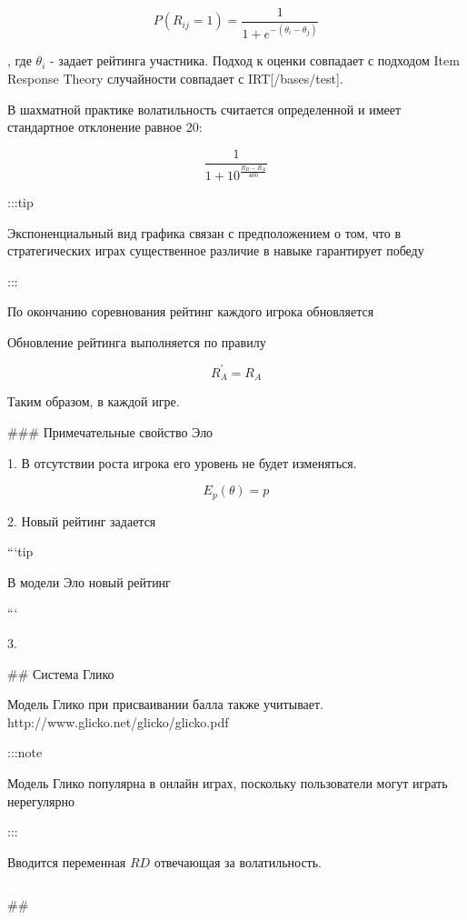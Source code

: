 $$
    P(R_{ij}=1) = \frac{1}{1 + e^{-(\theta_i - \theta_j)}}
$$

, где $\theta_i$ - задает рейтинга участника. Подход к оценки совпадает с подходом Item Response Theory случайности совпадает с IRT[/bases/test]. 





В шахматной практике волатильность считается определенной и имеет стандартное отклонение равное 20:

$$
    \frac{1}{1+10^\frac{R_B-R_A}{400}}
$$

:::tip

    Экспоненциальный вид графика связан с предположением о том, что в стратегических играх существенное различие в навыке гарантирует победу

:::

По окончанию соревнования рейтинг каждого игрока обновляется

Обновление рейтинга выполняется по правилу

$$
    R^'_A = R_A
$$


Таким образом, в каждой игре.

### Примечательные свойство Эло


1. В отсутствии роста игрока его уровень не будет изменяться.

$$
    E_p(\theta) = p 
$$


2. Новый рейтинг задается 
 
```tip

    В модели Эло новый рейтинг

```


3.



## Система Глико

Модель Глико при присваивании балла также учитывает. http://www.glicko.net/glicko/glicko.pdf

:::note

    Модель Глико популярна в онлайн играх, поскольку пользователи могут играть нерегулярно

:::

Вводится переменная $RD$ отвечающая за волатильность.

$$
    
$$


##

$$

$$